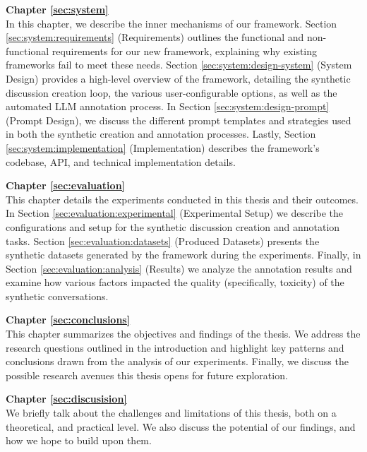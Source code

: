 \textbf{Chapter \ref{sec:system}} \\[0.2em]

In this chapter, we describe the inner mechanisms of our framework. Section \ref{sec:system:requirements} (Requirements) outlines the functional and non-functional requirements for our new framework, explaining why existing frameworks fail to meet these needs. Section \ref{sec:system:design-system} (System Design) provides a high-level overview of the framework, detailing the synthetic discussion creation loop, the various user-configurable options, as well as the automated LLM annotation process. In Section \ref{sec:system:design-prompt} (Prompt Design), we discuss the different prompt templates and strategies used in both the synthetic creation and annotation processes. Lastly, Section \ref{sec:system:implementation} (Implementation) describes the framework's codebase, \ac{API}, and technical implementation details.

\textbf{Chapter \ref{sec:evaluation}} \\[0.2em]

This chapter details the experiments conducted in this thesis and their outcomes. In Section \ref{sec:evaluation:experimental} (Experimental Setup) we describe the configurations and setup for the synthetic discussion creation and annotation tasks. Section \ref{sec:evaluation:datasets} (Produced Datasets)  presents the synthetic datasets generated by the framework during the experiments.  Finally, in Section \ref{sec:evaluation:analysis} (Results) we analyze the annotation results and examine how various factors impacted the quality (specifically, toxicity) of the synthetic conversations.


\textbf{Chapter \ref{sec:conclusions}} \\[0.2em]

This chapter summarizes the objectives and findings of the thesis. We address the research questions outlined in the introduction and highlight key patterns and conclusions drawn from the analysis of our experiments. Finally, we discuss the possible research avenues this thesis opens for future exploration.

\textbf{Chapter \ref{sec:discusision}} \\[0.2em]

We briefly talk about the challenges and limitations of this thesis, both on a theoretical, and practical level. We also discuss the potential of our findings, and how we hope to build upon them.
